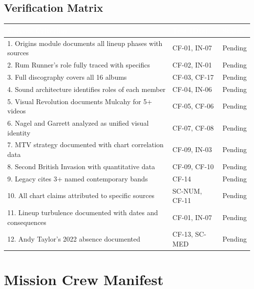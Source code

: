 \documentclass[11pt,letterpaper]{article}
\newcommand{\tableheader}[1]{\textbf{\sffamily\textcolor{white}{#1}}}
\begin{document}
\subsection{Verification Matrix}

\begin{center}
\begin{tabularx}{\textwidth}{XL{3.5cm}C{1.5cm}}
\toprule
{}
\tableheader{Success Criterion} & \tableheader{Test ID(s)} & \tableheader{Status} \\
. Origins module documents all lineup phases with sources & CF-01, IN-07 & Pending \\
2. Rum Runner's role fully traced with specifics & CF-02, IN-01 & Pending \\
3. Full discography covers all 16 albums & CF-03, CF-17 & Pending \\
4. Sound architecture identifies roles of each member & CF-04, IN-06 & Pending \\
5. Visual Revolution documents Mulcahy for 5+ videos & CF-05, CF-06 & Pending \\
6. Nagel and Garrett analyzed as unified visual identity & CF-07, CF-08 & Pending \\
7. MTV strategy documented with chart correlation data & CF-09, IN-03 & Pending \\
8. Second British Invasion with quantitative data & CF-09, CF-10 & Pending \\
9. Legacy cites 3+ named contemporary bands & CF-14 & Pending \\
10. All chart claims attributed to specific sources & SC-NUM, CF-11 & Pending \\
11. Lineup turbulence documented with dates and consequences & CF-01, IN-07 & Pending \\
12. Andy Taylor's 2022 absence documented & CF-13, SC-MED & Pending \\
\bottomrule
\end{tabularx}
\end{center}

\section{Mission Crew Manifest}
\end{document}
